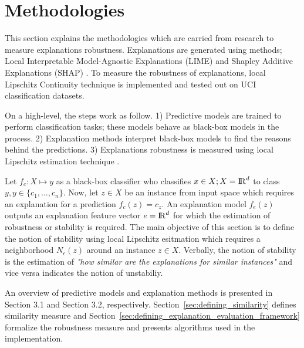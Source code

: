 \documentclass[english]{tktltiki2}
\theoremstyle{definition}
\theoremstyle{remark}
\begin{document}
\section{Methodologies} %
This section explains the methodologies which are carried from research to measure explanations robustness. Explanations are generated using methods; Local Interpretable Model-Agnostic Explanations (LIME) and Shapley Additive Explanations (SHAP) \citep{ribeiro2016should,lundberg2017unified}. To measure the robustness of explanations, local Lipschitz Continuity technique \citep{alvarez2018robustness} is implemented and tested out on UCI classification datasets.

On a high-level, the steps work as follow. 1) Predictive models are trained to perform classification tasks; these models behave as black-box models in the process. 2) Explanation methods interpret black-box models to find the reasons behind the predictions. 3) Explanations robustness is measured using local Lipschitz estimation technique \citep{alvarez2018robustness}.

Let $f_c: X \mapsto y$ as a black-box classifier who classifies $x \in X; X = {\rm I\!R}^d$ to class $y, y \in \{c_1, \dots, c_n\}$. Now, let $z \in X$ be an instance from input space which requires an explanation for a prediction $f_c(z) = c_z$. An explanation model $f_e(z)$ outputs an explanation feature vector $ e = {\rm I\!R}^d$ for which the estimation of robustness or stability is required. The main objective of this section is to define the notion of stability using local Lipschitz esitmation which requires a neighborhood $N_{\epsilon}(z)$ around an instance $z \in X$. Verbally, the notion of stability is the estimation of \textit{"how similar are the explanations for similar instances"} and vice versa indicates the notion of unstabiliy.

An overview of predictive models and explanation methods is presented in Section 3.1 and Section 3.2, respectively. Section~\ref{sec:defining_similarity} defines similarity measure and Section~\ref{sec:defining_explanation_evaluation_framework} formalize the robustness measure and presents algorithms used in the implementation.
\end{document}
